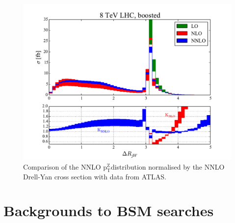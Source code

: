 \documentclass[a4paper,11pt,notoc]{article}
\newcommand{\ptZ}{\ensuremath{\mathrm{p_T^{Z}}}}
\begin{document}
\begin{figure}[t!]
\centering
\includegraphics[width=0.495\columnwidth]{delrjW.pdf} 
\caption{Comparison of the NNLO \ptZ distribution normalised by the NNLO Drell-Yan cross section with data from ATLAS.}
\label{fig:ptNNLO}
\end{figure}   


\section{Backgrounds to BSM searches}
\end{document}
